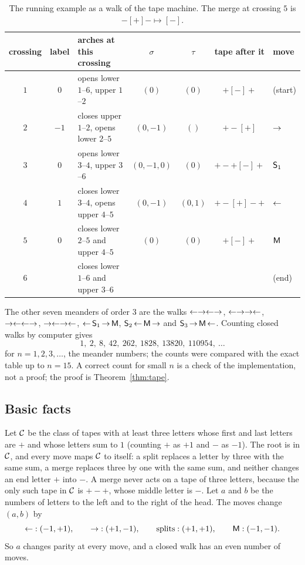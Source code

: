 \begin{table}[htb]
\centering
\small
\setlength{\tabcolsep}{4pt}
\begin{tabular}{cclcccl}
\toprule
crossing & label & arches at this crossing & $\sigma$ & $\tau$ & tape after it & move \\
\midrule
$1$ & $0$ & opens lower $1$--$6$, upper $1$--$2$ & $(0)$ & $(0)$ & $+[-]+$ & (start)\\
$2$ & $-1$ & closes upper $1$--$2$, opens lower $2$--$5$ & $(0,-1)$ & $()$ & $+-[+]$ & $\mathord{\rightarrow}$\\
$3$ & $0$ & opens lower $3$--$4$, upper $3$--$6$ & $(0,-1,0)$ & $(0)$ & $+-+[-]+$ & $\mathsf{S}_1$\\
$4$ & $1$ & closes lower $3$--$4$, opens upper $4$--$5$ & $(0,-1)$ & $(0,1)$ & $+-[+]-+$ & $\mathord{\leftarrow}$\\
$5$ & $0$ & closes lower $2$--$5$ and upper $4$--$5$ & $(0)$ & $(0)$ & $+[-]+$ & $\mathsf{M}$\\
$6$ & & closes lower $1$--$6$ and upper $3$--$6$ & & & & (end)\\
\bottomrule
\end{tabular}
\caption{The running example as a walk of the tape machine. The merge at crossing $5$ is $-[+]-\mapsto[-]$.}
\label{tab:example}
\end{table}

The other seven meanders of order $3$ are the walks $\mathord{\leftarrow}\mathord{\rightarrow}\mathord{\leftarrow}\mathord{\rightarrow}$, $\mathord{\leftarrow}\mathord{\rightarrow}\mathord{\rightarrow}\mathord{\leftarrow}$, $\mathord{\rightarrow}\mathord{\leftarrow}\mathord{\leftarrow}\mathord{\rightarrow}$, $\mathord{\rightarrow}\mathord{\leftarrow}\mathord{\rightarrow}\mathord{\leftarrow}$,
$\mathord{\leftarrow}\,\mathsf{S}_1\,\mathord{\rightarrow}\,\mathsf{M}$, $\mathsf{S}_2\,\mathord{\leftarrow}\,\mathsf{M}\,\mathord{\rightarrow}$ and $\mathsf{S}_3\,\mathord{\rightarrow}\,\mathsf{M}\,\mathord{\leftarrow}$. Counting closed walks by computer gives
\[ 1,\ 2,\ 8,\ 42,\ 262,\ 1828,\ 13820,\ 110954,\ \ldots \]
for $n=1,2,3,\ldots$, the meander numbers; the counts were compared with the exact table up to $n=15$. A
correct count for small $n$ is a check of the implementation, not a proof; the proof is Theorem~\ref{thm:tape}.

\subsection{Basic facts}

Let $\mathcal{C}$ be the class of tapes with at least three letters whose first and last letters are $+$ and whose letters
sum to $1$ (counting $+$ as $+1$ and $-$ as $-1$). The root is in $\mathcal{C}$, and every move maps $\mathcal{C}$ to itself: a split
replaces a letter by three with the same sum, a merge replaces three by one with the same sum, and neither changes an
end letter $+$ into $-$. A merge never acts on a tape of three letters, because the only such tape in $\mathcal{C}$ is $+-+$,
whose middle letter is $-$.
Let $a$ and $b$ be the numbers of letters to the left and to the right of the head. The moves change $(a,b)$ by
\begin{equation}\label{eq:drift}
  \mathord{\leftarrow}:(-1,+1),\qquad \mathord{\rightarrow}:(+1,-1),\qquad \text{splits}:(+1,+1),\qquad \mathsf{M}:(-1,-1).
\end{equation}
So $a$ changes parity at every move, and a closed walk has an even number of moves.

